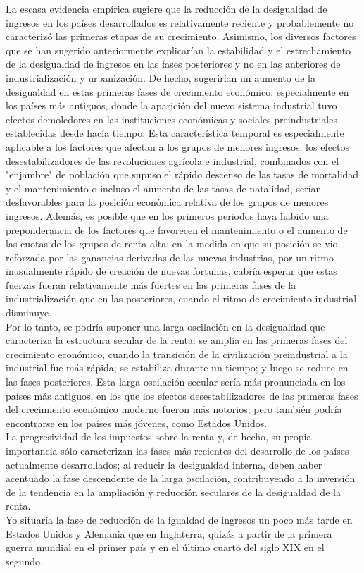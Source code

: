 La escasa evidencia empírica sugiere que la reducción de la desigualdad de ingresos en los países desarrollados es relativamente reciente y probablemente no caracterizó las primeras etapas de su crecimiento. Asimismo, los diversos factores que se han sugerido anteriormente explicarían la estabilidad y el estrechamiento de la desigualdad de ingresos en las fases posteriores y no en las anteriores de industrialización y urbanización. De hecho, sugerirían un aumento de la desigualdad en estas primeras fases de crecimiento económico, especialmente en los países más antiguos, donde la aparición del nuevo sistema industrial tuvo efectos demoledores en las instituciones económicas y sociales preindustriales establecidas desde hacía tiempo. Esta característica temporal es especialmente aplicable a los factores que afectan a los grupos de menores ingresos. los efectos desestabilizadores de las revoluciones agrícola e industrial, combinados con el "enjambre" de población que supuso el rápido descenso de las tasas de mortalidad y el mantenimiento o incluso el aumento de las tasas de natalidad, serían desfavorables para la posición económica relativa de los grupos de menores ingresos. Además, es posible que en los primeros periodos haya habido una preponderancia de los factores que favorecen el mantenimiento o el aumento de las cuotas de los grupos de renta alta: en la medida en que su posición se vio reforzada por las ganancias derivadas de las nuevas industrias, por un ritmo inusualmente rápido de creación de nuevas fortunas, cabría esperar que estas fuerzas fueran relativamente más fuertes en las primeras fases de la industrialización que en las posteriores, cuando el ritmo de crecimiento industrial disminuye.\\
Por lo tanto, se podría suponer una larga oscilación en la desigualdad que caracteriza la estructura secular de la renta: se amplía en las primeras fases del crecimiento económico, cuando la transición de la civilización preindustrial a la industrial fue más rápida; se estabiliza durante un tiempo; y luego se reduce en las fases posteriores. 
Esta larga oscilación secular sería más pronunciada en los países más antiguos, en los que los efectos desestabilizadores de las primeras fases del crecimiento económico moderno fueron más notorios; pero también podría encontrarse en los países más jóvenes, como Estados Unidos.\\
La progresividad de los impuestos sobre la renta y, de hecho, su propia importancia sólo caracterizan las fases más recientes del desarrollo de los países actualmente desarrollados; al reducir la desigualdad interna, deben haber acentuado la fase descendente de la larga oscilación, contribuyendo a la inversión de la tendencia en la ampliación y reducción seculares de la desigualdad de la renta.\\
Yo situaría la fase de reducción de la igualdad de ingresos un poco más tarde en Estados Unidos y Alemania que en Inglaterra, quizás a partir de la primera guerra mundial en el primer país y en el último cuarto del siglo XIX en el segundo.\\

